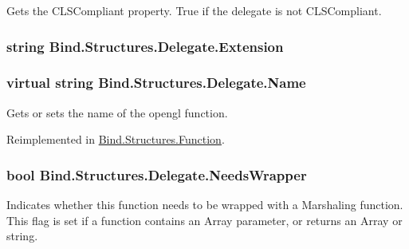 Gets the CLSCompliant property. True if the delegate is not CLSCompliant. 

\hypertarget{class_bind_1_1_structures_1_1_delegate_abc0add5a1fc2eeefc5597f8bd58fba5c}{
\subsubsection[{Extension}]{\setlength{\rightskip}{0pt plus 5cm}string Bind.Structures.Delegate.Extension}}
\label{class_bind_1_1_structures_1_1_delegate_abc0add5a1fc2eeefc5597f8bd58fba5c}
\hypertarget{class_bind_1_1_structures_1_1_delegate_a320cee119e89464c59f9ad8cec2fc4f7}{
\subsubsection[{Name}]{\setlength{\rightskip}{0pt plus 5cm}virtual string Bind.Structures.Delegate.Name}}
\label{class_bind_1_1_structures_1_1_delegate_a320cee119e89464c59f9ad8cec2fc4f7}


Gets or sets the name of the opengl function. 



Reimplemented in \hyperlink{class_bind_1_1_structures_1_1_function_a99ff266fee9cde8a0dfe69d0e0e33bc6}{Bind.Structures.Function}.

\hypertarget{class_bind_1_1_structures_1_1_delegate_aac54ac6f4d2ad31102396305cef03412}{
\subsubsection[{NeedsWrapper}]{\setlength{\rightskip}{0pt plus 5cm}bool Bind.Structures.Delegate.NeedsWrapper}}
\label{class_bind_1_1_structures_1_1_delegate_aac54ac6f4d2ad31102396305cef03412}


Indicates whether this function needs to be wrapped with a Marshaling function. This flag is set if a function contains an Array parameter, or returns an Array or string. 

